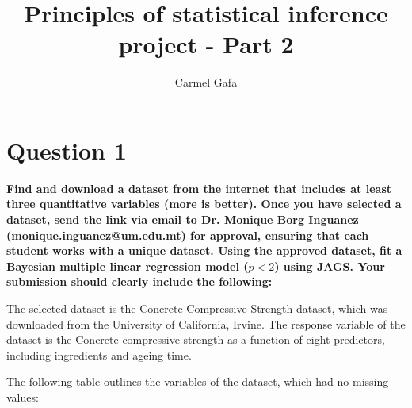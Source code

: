 \documentclass[]{article}
\title{Principles of statistical inference project - Part 2}
\author{Carmel Gafa}
\begin{document}
\maketitle



\section{Question 1}

\textbf{Find and download a dataset from the internet that includes at least three quantitative
variables (more is better). Once you have selected a dataset, send the link via email to Dr.
Monique Borg Inguanez (monique.inguanez@um.edu.mt) for approval, ensuring that each
student works with a unique dataset.
Using the approved dataset, fit a Bayesian multiple linear regression model ($p < 2$) using
JAGS.
Your submission should clearly include the following:}

\bigskip

The selected dataset is the Concrete Compressive Strength dataset, which was downloaded from the University of California, Irvine. The response variable of the dataset is the Concrete compressive strength as a function of eight predictors, including ingredients and ageing time.

The following table outlines the variables of the dataset, which had no missing values:
\end{document}
